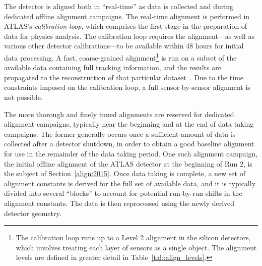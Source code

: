 The detector is aligned both in ``real-time'' as data is collected and during dedicated offline alignment campaigns.
The real-time alignment is performed in ATLAS's \emph{calibration loop}, which comprises the first stage in the preparation of data for physics analysis.
The calibration loop requires the alignment---as well as various other detector calibrations---to be available within 48 hours for initial data processing.
A fast, coarse-grained alignment\footnote{The calibration loop runs up to a Level 2 alignment in the silicon detectors, which involves treating each layer of sensors as a single object. The alignment levels are defined in greater detail in Table~\ref{tab:align_levels}.} is run on a subset of the available data containing full tracking information, and the results are propagated to the reconstruction of that particular dataset~\cite{2015.alignment-run-2-proceedings}.
Due to the time constraints imposed on the calibration loop, a full sensor-by-sensor alignment is not possible.

The more thorough and finely tuned alignments are reserved for dedicated alignment campaigns, typically near the beginning and at the end of data taking campaigns. 
The former generally occurs once a sufficient amount of data is collected after a detector shutdown, in order to obtain a good baseline alignment for use in the remainder of the data taking period.
One such alignment campaign, the initial offline alignment of the ATLAS detector at the beginning of Run 2, is the subject of Section~\ref{align:2015}.
Once data taking is complete, a new set of alignment constants is derived for the full set of available data, and it is typically divided into several ``blocks'' to account for potential run-by-run shifts in the alignment constants.
The data is then reprocessed using the newly derived detector geometry.

